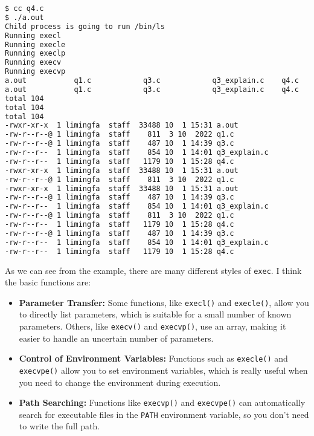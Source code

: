 \documentclass[10pt, answers]{exam}
\begin{document}
\begin{questions}
\begin{solution}
\begin{lstlisting}[language=bash]
$ cc q4.c
$ ./a.out
Child process is going to run /bin/ls
Running execl
Running execle
Running execlp
Running execv
Running execvp
a.out           q1.c            q3.c            q3_explain.c    q4.c                                                    
a.out           q1.c            q3.c            q3_explain.c    q4.c
total 104
total 104
total 104
-rwxr-xr-x  1 limingfa  staff  33488 10  1 15:31 a.out
-rw-r--r--@ 1 limingfa  staff    811  3 10  2022 q1.c
-rw-r--r--@ 1 limingfa  staff    487 10  1 14:39 q3.c
-rw-r--r--  1 limingfa  staff    854 10  1 14:01 q3_explain.c
-rw-r--r--  1 limingfa  staff   1179 10  1 15:28 q4.c
-rwxr-xr-x  1 limingfa  staff  33488 10  1 15:31 a.out
-rw-r--r--@ 1 limingfa  staff    811  3 10  2022 q1.c
-rwxr-xr-x  1 limingfa  staff  33488 10  1 15:31 a.out
-rw-r--r--@ 1 limingfa  staff    487 10  1 14:39 q3.c
-rw-r--r--  1 limingfa  staff    854 10  1 14:01 q3_explain.c
-rw-r--r--@ 1 limingfa  staff    811  3 10  2022 q1.c
-rw-r--r--  1 limingfa  staff   1179 10  1 15:28 q4.c
-rw-r--r--@ 1 limingfa  staff    487 10  1 14:39 q3.c
-rw-r--r--  1 limingfa  staff    854 10  1 14:01 q3_explain.c
-rw-r--r--  1 limingfa  staff   1179 10  1 15:28 q4.c
\end{lstlisting}

As we can see from the example, there are many different styles of \texttt{exec}. I think the basic functions are:

\begin{itemize}
    \item \textbf{Parameter Transfer:} Some functions, like \texttt{execl()} and \texttt{execle()}, allow you to directly list parameters, which is suitable for a small number of known parameters. Others, like \texttt{execv()} and \texttt{execvp()}, use an array, making it easier to handle an uncertain number of parameters.
    
    \item \textbf{Control of Environment Variables:} Functions such as \texttt{execle()} and \texttt{execvpe()} allow you to set environment variables, which is really useful when you need to change the environment during execution.
    
    \item \textbf{Path Searching:} Functions like \texttt{execvp()} and \texttt{execvpe()} can automatically search for executable files in the \texttt{PATH} environment variable, so you don’t need to write the full path.
\end{itemize}


\end{solution}
\end{questions}
\end{document}
